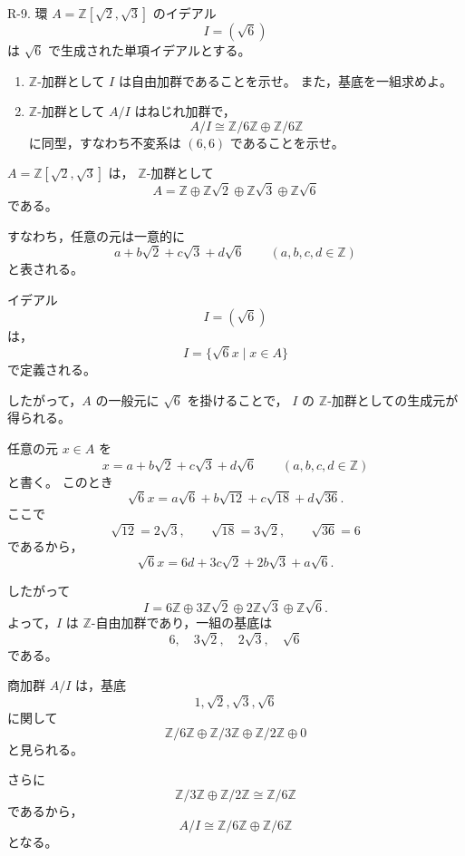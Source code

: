 
\begin{exercise}
	R-9. 環 $A=\mathbb{Z}[\sqrt{2},\sqrt{3}]$ のイデアル
	\[
	I=(\sqrt{6})
	\]
	は $\sqrt{6}$ で生成された単項イデアルとする。
	\begin{enumerate}
		\item $\mathbb{Z}$-加群として $I$ は自由加群であることを示せ。
		また，基底を一組求めよ。
		\item $\mathbb{Z}$-加群として $A/I$ はねじれ加群で，
		\[
		A/I\cong
		\mathbb{Z}/6\mathbb{Z}\oplus
		\mathbb{Z}/6\mathbb{Z}
		\]
		に同型，すなわち不変系は $(6,6)$ であることを示せ。
	\end{enumerate}
\end{exercise}

\begin{background}
	$A=\mathbb{Z}[\sqrt{2},\sqrt{3}]$ は，
	$\mathbb{Z}$-加群として
	\[
	A=
	\mathbb{Z}
	\oplus
	\mathbb{Z}\sqrt{2}
	\oplus
	\mathbb{Z}\sqrt{3}
	\oplus
	\mathbb{Z}\sqrt{6}
	\]
	である。
	
	すなわち，任意の元は一意的に
	\[
	a+b\sqrt{2}+c\sqrt{3}+d\sqrt{6}
	\qquad
	(a,b,c,d\in\mathbb{Z})
	\]
	と表される。
	
	イデアル
	\[
	I=(\sqrt{6})
	\]
	は，
	\[
	I=\{\sqrt{6}x\mid x\in A\}
	\]
	で定義される。
	
	したがって，$A$ の一般元に $\sqrt{6}$ を掛けることで，
	$I$ の $\mathbb{Z}$-加群としての生成元が得られる。
\end{background}

\begin{strategy}
	任意の元 $x\in A$ を
	\[
	x=a+b\sqrt{2}+c\sqrt{3}+d\sqrt{6}
	\qquad
	(a,b,c,d\in\mathbb{Z})
	\]
	と書く。
	このとき
	\[
	\sqrt{6}x
	=
	a\sqrt{6}
	+b\sqrt{12}
	+c\sqrt{18}
	+d\sqrt{36}.
	\]
	ここで
	\[
	\sqrt{12}=2\sqrt{3},
	\qquad
	\sqrt{18}=3\sqrt{2},
	\qquad
	\sqrt{36}=6
	\]
	であるから，
	\[
	\sqrt{6}x
	=
	6d+3c\sqrt{2}+2b\sqrt{3}+a\sqrt{6}.
	\]
	
	したがって
	\[
	I=
	6\mathbb{Z}
	\oplus
	3\mathbb{Z}\sqrt{2}
	\oplus
	2\mathbb{Z}\sqrt{3}
	\oplus
	\mathbb{Z}\sqrt{6}.
	\]
	よって，$I$ は $\mathbb{Z}$-自由加群であり，一組の基底は
	\[
	6,\quad 3\sqrt{2},\quad 2\sqrt{3},\quad \sqrt{6}
	\]
	である。
	
	商加群 $A/I$ は，基底
	\[
	1,\sqrt{2},\sqrt{3},\sqrt{6}
	\]
	に関して
	\[
	\mathbb{Z}/6\mathbb{Z}
	\oplus
	\mathbb{Z}/3\mathbb{Z}
	\oplus
	\mathbb{Z}/2\mathbb{Z}
	\oplus
	0
	\]
	と見られる。
	
	さらに
	\[
	\mathbb{Z}/3\mathbb{Z}
	\oplus
	\mathbb{Z}/2\mathbb{Z}
	\cong
	\mathbb{Z}/6\mathbb{Z}
	\]
	であるから，
	\[
	A/I
	\cong
	\mathbb{Z}/6\mathbb{Z}
	\oplus
	\mathbb{Z}/6\mathbb{Z}
	\]
	となる。
\end{strategy}